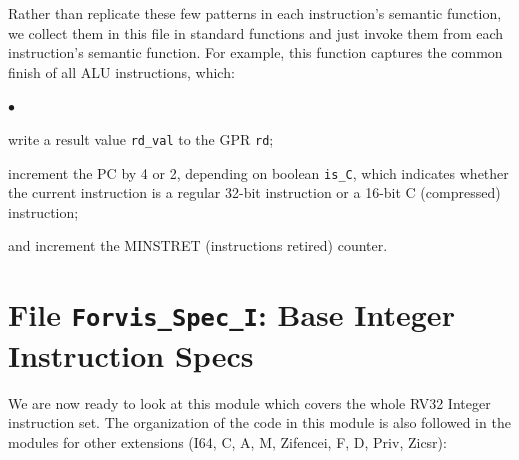 \documentclass[11pt]{article}
\newenvironment{tightlist}%
{\begin{list}{$\bullet$}{%
    \setlength{\topsep}{0in}
    \setlength{\partopsep}{0in}
    \setlength{\itemsep}{0in}
    \setlength{\parsep}{0in}
    \setlength{\leftmargin}{1.5em}
    \setlength{\rightmargin}{0in}
    \setlength{\itemindent}{0in}
}
}%
{\end{list}
}
\begin{document}
Rather than replicate these few patterns in each instruction's
semantic function, we collect them in this file in standard functions
and just invoke them from each instruction's semantic function.  For
example, this function captures the common finish of all ALU
instructions, which:

\begin{tightlist}

\item write a result value \verb|rd_val| to the GPR \verb|rd|;

\item increment the PC by 4 or 2, depending on boolean \verb|is_C|,
which indicates whether the current instruction is a regular 32-bit
instruction or a 16-bit C (compressed) instruction;

\item and increment the MINSTRET (instructions retired) counter.

\end{tightlist}




\section{File {\tt Forvis\_Spec\_I}: Base Integer Instruction Specs}

\label{sec_ISA_spec_I}

We are now ready to look at this module which covers the whole RV32
Integer instruction set.  The organization of the code in this module
is also followed in the modules for other extensions (I64, C, A, M,
Zifencei, F, D, Priv, Zicsr):
\end{document}
